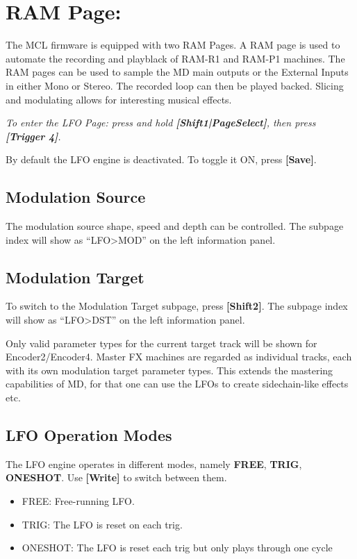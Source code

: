 \chapter{RAM Page:}
The MCL firmware is equipped with two RAM Pages. A RAM page is used to automate the recording and playblack of RAM-R1 and RAM-P1 machines.
The RAM pages can be used to sample the MD main outputs or the External Inputs in either Mono or Stereo. The recorded loop can then be played backed.
Slicing and modulating allows for interesting musical effects.

\textit{To enter the LFO Page: press and hold \textbf{[Shift1|PageSelect]}, then press \textbf{[Trigger 4]}.}

By default the LFO engine is deactivated. To toggle it ON, press \textbf{[Save]}.


\section{Modulation Source}

The modulation source shape, speed and depth can be controlled. The subpage index will show as ``LFO>MOD'' on the left information panel.


\newpage


\section{Modulation Target}
To switch to the Modulation Target subpage, press \textbf{[Shift2]}. The subpage index will show as ``LFO>DST'' on the left information panel.


Only valid parameter types for the current target track will be shown for Encoder2/Encoder4. Master FX machines are regarded as individual tracks, each with its own modulation target parameter types. This extends the mastering capabilities of MD, for that one can use the LFOs to create sidechain-like effects etc.


\section{LFO Operation Modes}

The LFO engine operates in different modes, namely \textbf{FREE}, \textbf{TRIG}, \textbf{ONESHOT}. Use \textbf{[Write]} to switch between them.
\begin{itemize}
    \item FREE: Free-running LFO.
    \item TRIG: The LFO is reset on each trig.
    \item ONESHOT: The LFO is reset each trig but only plays through one cycle
\end{itemize}